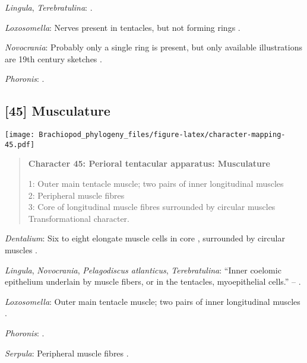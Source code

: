 \documentclass[openany]{book}
\theoremstyle{definition}
\theoremstyle{definition}
\theoremstyle{definition}
\theoremstyle{remark}
\begin{document}
\hypertarget{Lingula-coding-44}{}
\emph{Lingula}, \emph{Terebratulina}: \citet{Temereva2017Innervationof}.

\hypertarget{Loxosomella-coding-44}{}
\emph{Loxosomella}: Nerves present in tentacles, but not forming rings
\citep{Fuchs2006}.

\hypertarget{Novocrania-coding-44}{}
\emph{Novocrania}: Probably only a single ring is present, but only
available illustrations are 19th century sketches \citep{Luter2016}.

\hypertarget{Phoronis-coding-44}{}
\emph{Phoronis}: \citet{Temereva2017Thefirst}.

\subsection*{{[}45{]} Musculature}\label{musculature}

\texttt{[image: Brachiopod\_phylogeny\_files/figure-latex/character-mapping-45.pdf]}

\begin{quote}
\textbf{Character 45: Perioral tentacular apparatus: Musculature}

1: Outer main tentacle muscle; two pairs of inner longitudinal muscles\\
2: Peripheral muscle fibres\\
3: Core of longitudinal muscle fibres surrounded by circular muscles\\
Transformational character.
\end{quote}

\hypertarget{Dentalium-coding-45}{}
\emph{Dentalium}: Six to eight elongate muscle cells in core
\citep{Shimek1988}, surrounded by circular muscles \citep{Byrum1994}.

\hypertarget{Lingula-coding-45}{}
\emph{Lingula}, \emph{Novocrania}, \emph{Pelagodiscus atlanticus},
\emph{Terebratulina}: ``Inner coelomic epithelium underlain by muscle
fibers, or in the tentacles, myoepithelial cells.'' --
\citet{Williams1997Introduction}.

\hypertarget{Loxosomella-coding-45}{}
\emph{Loxosomella}: Outer main tentacle muscle; two pairs of inner
longitudinal muscles \citep{Fuchs2006}.

\hypertarget{Phoronis-coding-45}{}
\emph{Phoronis}: \citep{Pardos1991}.

\hypertarget{Serpula-coding-45}{}
\emph{Serpula}: Peripheral muscle fibres \citep{Hanson1949}.
\end{document}
